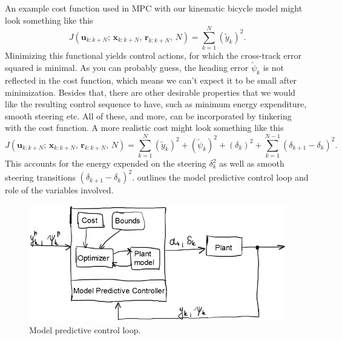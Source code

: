 \documentclass[a4paper]{article}
\begin{document}
An example cost function used in MPC with our kinematic bicycle model might look something like this
\begin{equation}\label{eq:mpc_cost_simple}
	J(\bm{u}_{k:k+N};\, \bm{x}_{k:k+N},\, \bm{r}_{k:k+N},\, N) = \sum_{k=1}^{N} (\tilde{y}_k)^2.
\end{equation}
Minimizing this functional yields control actions, for which the cross-track error squared is minimal.
As you can probably guess, the heading error \( \tilde{\psi}_k \) is not reflected in the cost function, which means we can't expect it to be small after minimization.
Besides that, there are other desirable properties that we would like the resulting control sequence to have, such as minimum energy expenditure, smooth steering etc.
All of these, and more, can be incorporated by tinkering with the cost function.
A more realistic cost might look something like this
\begin{equation}\label{eq:mpc_cost_better}
	J(\bm{u}_{k:k+N};\, \bm{x}_{k:k+N},\, \bm{r}_{k:k+N},\, N) = \sum_{k=1}^{N} (\tilde{y}_k)^2 + (\tilde{\psi}_k)^2 + (\delta_k)^2+ \sum_{k=1}^{N-1} (\delta_{k+1} - \delta_k)^2.
\end{equation}
This accounts for the energy expended on the steering \( \delta_k^2 \) as well as smooth steering transitions \( (\delta_{k+1} - \delta_k)^2 \).
 outlines the model predictive control loop and role of the variables involved.
\begin{figure}[h]
	\centering
	\includegraphics[width=0.8\columnwidth]{./img/mpc_control_loop.png}
	\caption{Model predictive control loop.}
	\label{fig:mpc_control_loop}
\end{figure}
\end{document}
